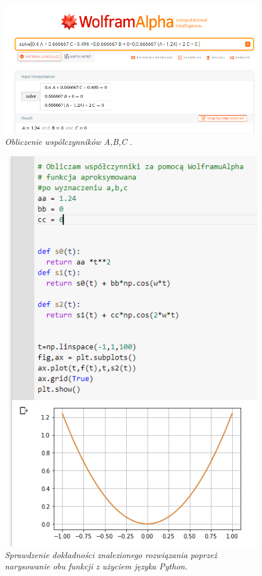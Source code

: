 \documentclass[12pt,oneside,a4paper]{book} %
\begin{document}
\begin{figure}[h]
\begin{center} 
\includegraphics[scale=0.6]{./images/05a.PNG} 
\caption{\textit{Obliczenie wspólczynników A,B,C }.\newline }
\label{rys:logoup}
\end{center}
\end{figure}

\begin{figure}[h]
\begin{center} 
\includegraphics[scale=1.2]{./images/06a.PNG} 
\caption{\textit{Sprawdzenie dokładności znalezionego rozwiązania poprzeż narysowanie obu funkcji z użyciem języka Python. }\newline }
\label{rys:logoup}
\end{center}
\end{figure}
\end{document}
